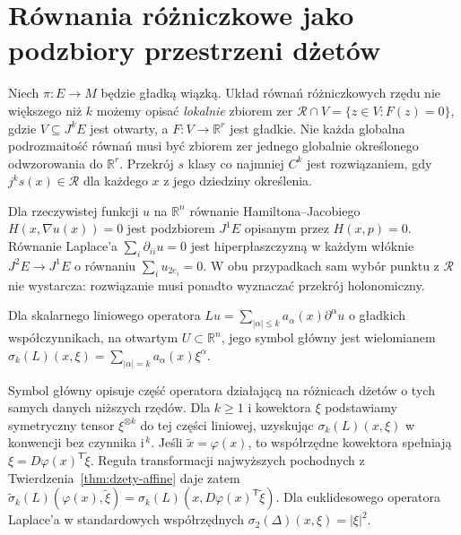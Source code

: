 \section{Równania różniczkowe jako podzbiory przestrzeni dżetów}
\begin{definicja}
\label{def:dzety-pde}
Niech $\pi:E\to M$ będzie gładką wiązką.
Układ równań różniczkowych rzędu nie większego niż $k$
możemy opisać \emph{lokalnie} zbiorem zer
$\mathcal R\cap V=\{z\in V:F(z)=0\}$, gdzie
$V\subseteq J^kE$ jest otwarty, a
$F:V\to\mathbb R^r$ jest gładkie. Nie każda globalna
podrozmaitość równań musi być zbiorem zer jednego
globalnie określonego odwzorowania do $\mathbb R^r$.
Przekrój $s$ klasy co najmniej $C^k$ jest rozwiązaniem,
gdy $j^ks(x)\in\mathcal R$ dla każdego $x$ z jego
dziedziny określenia.
\end{definicja}

\begin{przyklad}
Dla rzeczywistej funkcji $u$ na $\mathbb R^n$
równanie Hamiltona--Jacobiego
$H(x,\nabla u(x))=0$ jest podzbiorem $J^1E$
opisanym przez $H(x,p)=0$. Równanie Laplace'a
$\sum_i\partial_{ii}u=0$ jest hiperpłaszczyzną
w każdym włóknie $J^2E\to J^1E$ o równaniu
$\sum_i u_{2e_i}=0$. W obu przypadkach sam wybór
punktu z $\mathcal R$ nie wystarcza: rozwiązanie
musi ponadto wyznaczać przekrój holonomiczny.
\end{przyklad}

\begin{definicja}
\label{def:dzety-symbol}
Dla skalarnego liniowego operatora
$Lu=\sum_{|\alpha|\le k}a_\alpha(x)\partial^\alpha u$
o gładkich współczynnikach, na otwartym $U\subset\mathbb R^n$,
jego symbol główny jest wielomianem
$\sigma_k(L)(x,\xi)=\sum_{|\alpha|=k}a_\alpha(x)\xi^\alpha$.
\end{definicja}

\begin{uwaga}
Symbol główny opisuje część operatora działającą
na różnicach dżetów o tych samych danych niższych rzędów.
Dla $k\ge1$ i kowektora $\xi$ podstawiamy symetryczny
tensor $\xi^{\otimes k}$ do tej części liniowej,
uzyskując $\sigma_k(L)(x,\xi)$ w konwencji bez
czynnika $\mathrm i^{\,k}$.
Jeśli $\widetilde x=\varphi(x)$, to współrzędne
kowektora spełniają $\xi=D\varphi(x)^{\mathsf T}
\widetilde\xi$. Reguła transformacji najwyższych
pochodnych z Twierdzenia~\ref{thm:dzety-affine}
daje zatem
$\widetilde\sigma_k(L)(\varphi(x),\widetilde\xi)
=\sigma_k(L)(x,D\varphi(x)^{\mathsf T}\widetilde\xi)$.
Dla euklidesowego operatora Laplace'a w standardowych
współrzędnych $\sigma_2(\Delta)(x,\xi)=|\xi|^2$.
\end{uwaga}

